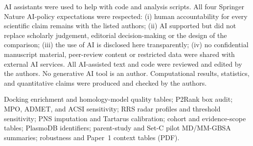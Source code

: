 \documentclass[journal=jcisd8,manuscript=article,layout=traditional]{achemso}
\begin{document}
AI assistants were used to help with code and analysis scripts. All four Springer Nature AI-policy expectations were respected: (i) human accountability for every scientific claim remains with the listed authors; (ii) AI supported but did not replace scholarly judgement, editorial decision-making or the design of the comparison; (iii) the use of AI is disclosed here transparently; (iv) no confidential manuscript material, peer-review content or restricted data were shared with external AI services. All AI-assisted text and code were reviewed and edited by the authors. No generative AI tool is an author. Computational results, statistics, and quantitative claims were produced and checked by the authors.

\begin{suppinfo}
Docking enrichment and homology-model quality tables; P2Rank box audit; MPO, ADMET, and ACSI sensitivity; RRS radar profiles and threshold sensitivity; PNS imputation and Tartarus calibration; cohort and evidence-scope tables; PlasmoDB identifiers; parent-study and Set-C pilot MD/MM-GBSA summaries; robustness and Paper~1 context tables (PDF).
\end{suppinfo}



\end{document}
